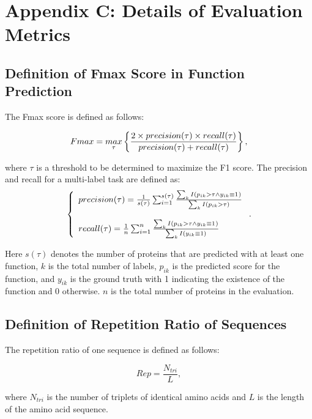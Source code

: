 \documentclass{article}
\begin{document}
\section*{Appendix C: Details of Evaluation Metrics}
\subsection*{Definition of Fmax Score in Function Prediction}

The Fmax score is defined as follows:

\begin{equation}
\label{eq:Fmax}
Fmax = \underset{\tau}{max}\left\{ \frac{2\times precision(\tau)\times recall(\tau)}{precision(\tau)+ recall(\tau)} \right\}\space,
\end{equation}

\noindent where $\tau$ is a threshold to be determined to maximize the F1 score. The precision and recall for a multi-label task are defined as:
\begin{equation}
\left\{
\begin{array}{l}
precision(\tau) = \frac{1}{s(\tau)}\sum_{i=1}^{s(\tau)}\frac{\sum_{k}^{}I(p_{ik}>\tau \wedge y_{ik}\equiv 1{}^{} )}{\sum_{k}^{}I(p_{ik}>\tau)} \\
\\
recall(\tau) = \frac{1}{n}\sum_{i=1}^{n}\frac{\sum_{k}^{}I(p_{ik}>\tau \wedge y_{ik}\equiv 1{}^{} )}{\sum_{k}^{}I(y_{ik}\equiv 1)}
\end{array}
\right.\space\space.
\end{equation}

Here $s(\tau)$ denotes the number of proteins that are predicted with at least one function, $k$ is the total number of labels, $p_{ik}$ is the predicted score for the function, and $y_{ik}$ is the ground truth with 1 indicating the existence of the function and 0 otherwise. $n$ is the total number of proteins in the evaluation.

\subsection*{Definition of Repetition Ratio of Sequences}

The repetition ratio of one sequence is defined as follows:

\begin{equation}
Rep = \frac{N_{tri}}{L},
\end{equation}

\noindent where $N_{tri}$ is the number of triplets of identical amino acids and $L$ is the length of the amino acid sequence. 
\end{document}
